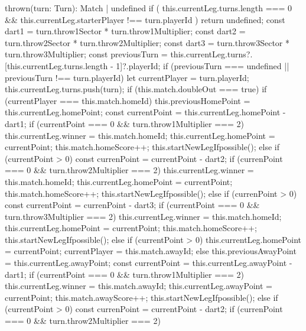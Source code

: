 \begin{cpp}
thrown(turn: Turn): Match | undefined {
    if (
      this.currentLeg.turns.length === 0 &&
      this.currentLeg.starterPlayer !== turn.playerId
    ) {
      return undefined;
    }
    const dart1 = turn.throw1Sector * turn.throw1Multiplier;
    const dart2 = turn.throw2Sector * turn.throw2Multiplier;
    const dart3 = turn.throw3Sector * turn.throw3Multiplier;
    const previousTurn =
     this.currentLeg.turns?.[this.currentLeg.turns.length - 1]?.playerId;
    if (previousTurn === undefined || previousTurn !== turn.playerId) {
      let currentPlayer = turn.playerId;
      this.currentLeg.turns.push(turn);
      if (this.match.doubleOut === true) {
        if (currentPlayer === this.match.homeId) {
          this.previousHomePoint = this.currentLeg.homePoint;
          const currentPoint = this.currentLeg.homePoint - dart1;
          if (currentPoint === 0 && turn.throw1Multiplier === 2) {
            this.currentLeg.winner = this.match.homeId;
            this.currentLeg.homePoint = currentPoint;
            this.match.homeScore++;
            this.startNewLegIfpossible();
          } else if (currentPoint > 0) {
            const currenPoint = currentPoint - dart2;
            if (currenPoint === 0 && turn.throw2Multiplier === 2) {
              this.currentLeg.winner = this.match.homeId;
              this.currentLeg.homePoint = currentPoint;
              this.match.homeScore++;
              this.startNewLegIfpossible();
            } else if (currenPoint > 0) {
              const currentPoint = currenPoint - dart3;
              if (currentPoint === 0 && turn.throw3Multiplier === 2) {
                this.currentLeg.winner = this.match.homeId;
                this.currentLeg.homePoint = currentPoint;
                this.match.homeScore++;
                this.startNewLegIfpossible();
              } else if (currentPoint > 0) {
                this.currentLeg.homePoint = currentPoint;
              }
            }
          }
          currentPlayer = this.match.awayId;
        } else {
          this.previousAwayPoint = this.currentLeg.awayPoint;
          const currentPoint = this.currentLeg.awayPoint - dart1;
          if (currentPoint === 0 && turn.throw1Multiplier === 2) {
            this.currentLeg.winner = this.match.awayId;
            this.currentLeg.awayPoint = currentPoint;
            this.match.awayScore++;
            this.startNewLegIfpossible();
          } else if (currentPoint > 0) {
            const currenPoint = currentPoint - dart2;
            if (currenPoint === 0 && turn.throw2Multiplier === 2) {
}}}}}}
\end{cpp}
